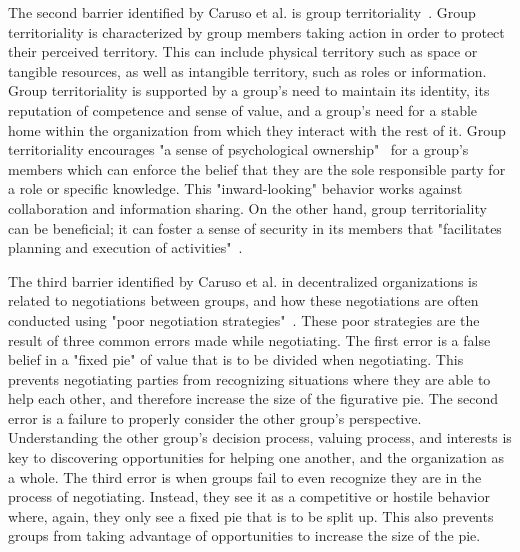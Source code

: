 The second barrier identified by Caruso et al. is group territoriality~\cite{caruso2008boundaries}. Group territoriality is characterized by group members taking action in order to protect their perceived territory. This can include physical territory such as space or tangible resources, as well as intangible territory, such as roles or information. Group territoriality is supported by a group's need to maintain its identity, its reputation of competence and sense of value, and a group's need for a stable home within the organization from which they interact with the rest of it. Group territoriality encourages "a sense of psychological ownership"~\cite{caruso2008boundaries} for a group's members which can enforce the belief that they are the sole responsible party for a role or specific knowledge. This "inward-looking" behavior works against collaboration and information sharing. On the other hand, group territoriality can be beneficial; it can foster a sense of security in its members that "facilitates planning and execution of activities"~\cite{caruso2008boundaries}. 

The third barrier identified by Caruso et al. in decentralized organizations is related to negotiations between groups, and how these negotiations are often conducted using "poor negotiation  strategies"~\cite{caruso2008boundaries}. These poor strategies are the result of three common errors made while negotiating. The first error is a false belief in a "fixed pie" of value that is to be divided when negotiating. This prevents negotiating parties from recognizing situations where they are able to help each other, and therefore increase the size of the figurative pie. The second error is a failure to properly consider the other group's perspective. Understanding the other group's decision process, valuing process, and interests is key to discovering opportunities for helping one another, and the organization as a whole. The third error is when groups fail to even recognize they are in the process of negotiating. Instead, they see it as a competitive or hostile behavior where, again, they only see a fixed pie that is to be split up. This also prevents groups from taking advantage of opportunities to increase the size of the pie.    



